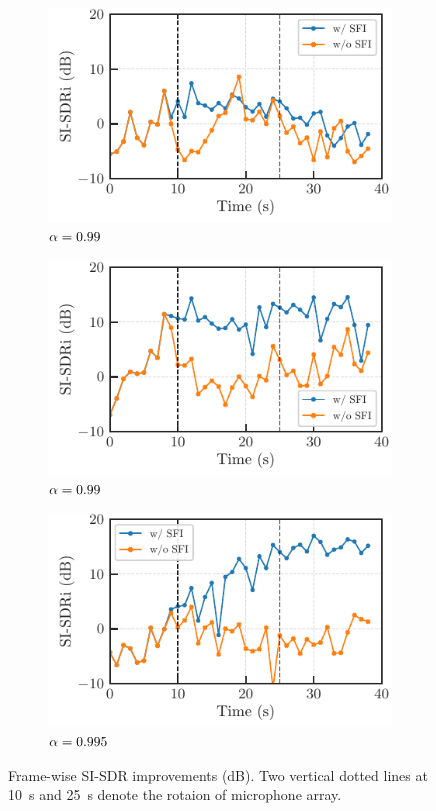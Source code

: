 \documentclass{article}
\begin{document}
\begin{figure}[t]
  \centering
  \begin{subfigure}[t]{\linewidth}
    \includegraphics{figures/plots/online/Gauss_8000_97.pdf}
    \caption{$\alpha = 0.99$}
  \end{subfigure}
  \begin{subfigure}[t]{\linewidth}
    \includegraphics{figures/plots/online/Gauss_8000_99.pdf}
    \caption{$\alpha = 0.99$}
  \end{subfigure}
  \begin{subfigure}[t]{\linewidth}
    \includegraphics{figures/plots/online/Gauss_8000_995.pdf}
    \caption{$\alpha = 0.995$}
  \end{subfigure}
  \caption{Frame-wise SI-SDR improvements (dB). Two vertical dotted lines at \SI{10}{\second} and \SI{25}{\second} denote the rotaion of microphone array.}
  \label{fig:online}
\end{figure}
\end{document}
